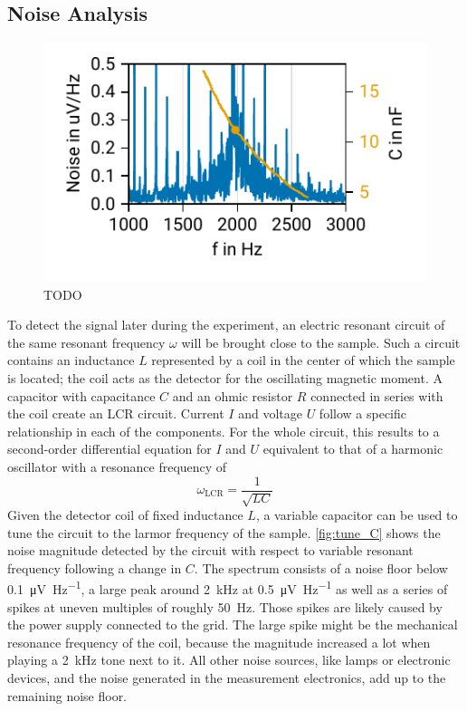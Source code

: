 \documentclass[
    parskip=half, 
    twoside=false,
    twocolumn=true,
    fontsize=11pt,
]{scrarticle}
\begin{document}
\subsection{Noise Analysis}
\begin{figure}[h]
    \centering
    \label{fig:tune_C}
    \includegraphics{figures/01 noise.pdf}
    \caption{TODO}
\end{figure}

To detect the signal later during the experiment, an electric resonant circuit of the same resonant frequency $\omega$ will be brought close to the sample. Such a circuit contains an inductance $L$ represented by a coil in the center of which the sample is located; the coil acts as the detector for the oscillating magnetic moment. A capacitor with capacitance $C$ and an ohmic resistor $R$ connected in series with the coil create an LCR circuit. Current $I$ and voltage $U$ follow a specific relationship in each of the components. For the whole circuit, this results to a second-order differential equation for $I$ and $U$ equivalent to that of a harmonic oscillator with a resonance frequency of
\begin{equation}
 \label{eq:LCR_frequency}
 \omega_{\text{LCR}} = \frac{1}{\sqrt{LC}}
\end{equation}
Given the detector coil of fixed inductance $L$, a variable capacitor can be used to tune the circuit to the larmor frequency of the sample. \autoref{fig:tune_C} shows the noise magnitude detected by the circuit with respect to variable resonant frequency following a change in $C$. The spectrum consists of a noise floor below \SI{0.1}{\micro \volt \per \hertz}, a large peak around \SI{2}{\kilo \hertz} at \SI{0.5}{\micro \volt \per \hertz} as well as a series of spikes at uneven multiples of roughly \SI{50}{\hertz}. Those spikes are likely caused by the power supply connected to the grid. The large spike might be the mechanical resonance frequency of the coil, because the magnitude increased a lot when playing a \SI{2}{\kilo \hertz} tone next to it. All other noise sources, like lamps or electronic devices, and the noise generated in the measurement electronics, add up to the remaining noise floor.
\end{document}
